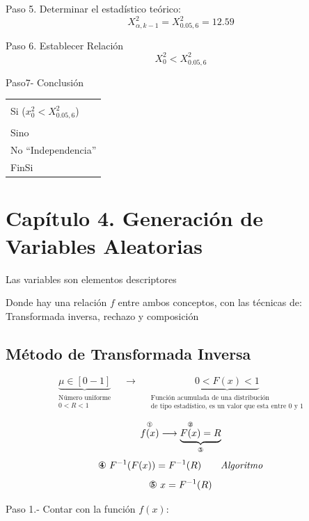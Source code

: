 \documentclass[11pt,letterpaper]{report}
\newenvironment{algoritmo}
  {\begin{center}\begin{tabular}{|p{0.85\textwidth}|}\hline\vspace{-0.2cm}\begin{tabbing}\hspace{0.6cm}\=\hspace{0.6cm}\=\hspace{0.6cm}\=\hspace{0.6cm}\=\hspace{0.6cm}\=\kill}
  {\end{tabbing}\vspace{-0.4cm}\\\hline\end{tabular}\end{center}}
\begin{document}
Paso 5. Determinar el estadístico teórico:
\[
X_{\alpha,k-1}^2 = X_{0.05,6}^2 = 12.59
\]

Paso 6. Establecer Relación
\[
X_0^2 < X_{0.05,6}^2
\]

Paso7- Conclusión

\begin{algoritmo}
\>$4.02248 < 12.59$\\
\>Si ($x_0^2 < X_{0.05,6}^2$)\\
\>\>\fbox{``Independencia''}\\
\>Sino\\
\>\>No ``Independencia''\\
\>FinSi
\end{algoritmo}

\section*{Capítulo 4. Generación de Variables Aleatorias}

Las variables son elementos descriptores

\begin{center}
\end{center}

Donde hay una relación $f$ entre ambos conceptos, con las técnicas de: Transformada inversa, rechazo y composición

\subsection*{Método de Transformada Inversa}

\[
\underbrace{\mu \in [0 - 1]}_{\substack{\text{Número uniforme}\\ 0 < R < 1}}
\quad\longrightarrow\quad
\underbrace{0 < F(x) < 1}_{\substack{\text{Función acumulada de una distribución}\\ \text{de tipo estadístico, es un valor que esta entre 0 y 1}}}
\]

\[
\overset{\text{\ding{172}}}{f(x)} \longrightarrow \underbrace{\overset{\text{\ding{173}}}{F(x)} = R}_{\text{\ding{174}}}
\]
\[
\text{\ding{175}}\ F^{-1}(F(x)) = F^{-1}(R) \qquad \textit{Algoritmo}
\]
\[
\text{\ding{176}}\ x = F^{-1}(R)
\]

Paso 1.- Contar con la función $f(x)$:
\end{document}
